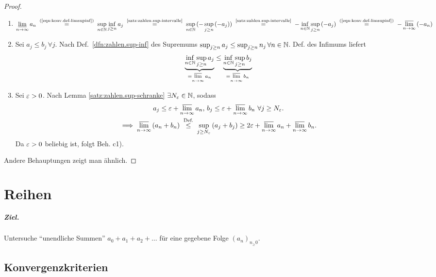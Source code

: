 \documentclass[12pt]{scrreprt}
\begin{document}
\begin{proof}
  \begin{enumerate}
  \item \[ \li_{\ninf}{a_n} \nach{=}{(\ref{eqn:konv.def-limsupinf})}
    \sup_{\nat{n}}{\inf_{j\ge n}{a_j}}
    \nach{=}{\ref{satz:zahlen.sup-intervalle}}
    \sup_{\nat{n}}{(-\sup_{j\ge n}{(-a_j)})}
    \nach{=}{\ref{satz:zahlen.sup-intervalle}}
    -\inf_{\nat{n}}{\sup_{j\ge n}{(-a_j)}}
    \nach{=}{(\ref{eqn:konv.def-limsupinf})}
    -\ls_{\ninf}{(-a_n)} \]
  \item Sei $a_j\le b_j\,\forall j$. Nach
    Def.~\ref{dfn:zahlen.sup-inf} des Supremums $\sup_{j\ge n}{a_j}
    \le \sup_{j\ge n}{n_j}\,\forall n\in\mathbb{N}$. Def. des Infimums liefert
    \[\underbrace{\inf_{n\in\mathbb{N}}{\sup_{j\ge n}{a_j}}}_{=\varlimsup\limits_{n\rightarrow\infty}{a_n}}
    \le \underbrace{\inf_{n\in\mathbb{N}}{\sup_{j\ge n}{b_j}}}_{=\varlimsup\limits_{n\rightarrow\infty}{b_n}} \]
  \item Sei $\varepsilon>0$. Nach Lemma \ref{satz:zahlen.sup-schranke}
    $\exists N_\varepsilon\in\mathbb{N}$, sodass
    \begin{gather*}
      a_j\le\ep+\ls_{\ninf}{a_n} \text{, }
      b_j\le\ep+\ls_{\ninf}{b_n}\ \forall j\ge N_\ep.\\
      \folgt \ls_{\ninf}{(a_n+b_n)} \nach{\le}{Def.} \sup_{j\ge
        N_\ep}{(a_j+b_j)} \ge 2\ep + \ls_{\ninf}{a_n} +
      \ls_{\ninf}{b_n}.
    \end{gather*}
    Da $\varepsilon>0$ beliebig ist, folgt Beh. c1).
  \end{enumerate}
  Andere Behauptungen zeigt man ähnlich.
\end{proof}

\chapter{Reihen}
\label{cha:reihen}

\paragraph{Ziel.} Untersuche "`unendliche Summen"'
$a_0+a_1+a_2+\dotsc$ für eine gegebene Folge $(a_n)_{n_\ge0}$.

\section{Konvergenzkriterien}
\label{sec:reihen.konvkrit}
\end{document}
